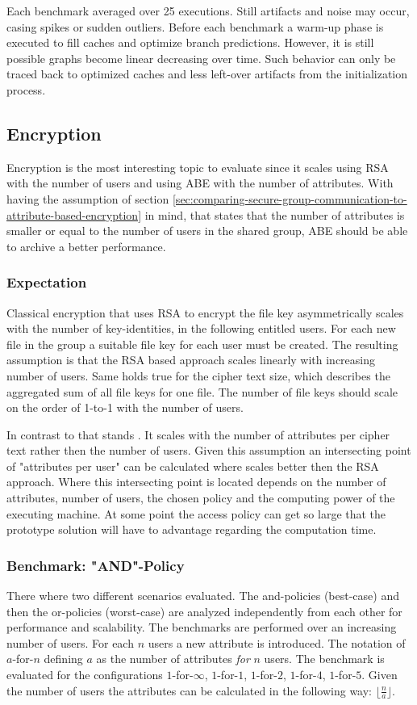 Each benchmark averaged over 25 executions. Still artifacts and noise may occur, casing spikes or sudden outliers. Before each benchmark a warm-up phase is executed to fill caches and optimize branch predictions. However, it is still possible graphs become linear decreasing over time. Such behavior can only be traced back to optimized caches and less left-over artifacts from the initialization process.

\subsection{Encryption}
Encryption is the most interesting topic to evaluate since it scales using RSA with the number of users and using ABE with the number of attributes. With having the assumption of section \ref{sec:comparing-secure-group-communication-to-attribute-based-encryption} in mind, that states that the number of attributes is smaller or equal to the number of users in the shared group, ABE should be able to archive a better performance. 

\subsubsection{Expectation}
Classical encryption that uses RSA to encrypt the file key asymmetrically scales with the number of key-identities, in the following entitled users. For each new file in the group a suitable file key for each user must be created. The resulting assumption is that the RSA based approach scales linearly with increasing number of users. Same holds true for the cipher text size, which describes the aggregated sum of all file keys for one file. The number of file keys should scale on the order of 1-to-1 with the number of users. 

In contrast to that stands \name. It scales with the number of attributes per cipher text rather then the number of users. Given this assumption an intersecting point of "attributes per user" can be calculated where \name scales better then the RSA approach. Where this intersecting point is located depends on the number of attributes, number of users, the chosen policy and the computing power of the executing machine. At some point the access policy can get so large that the prototype solution will have to advantage regarding the computation time. 

\subsubsection{Benchmark: "AND"-Policy}
There where two different scenarios evaluated. The and-policies (best-case) and then the or-policies (worst-case) are analyzed independently from each other for performance and scalability. The benchmarks are performed over an increasing number of users. For each $n$ users a new attribute is introduced. The notation of $a$-for-$n$ defining $a$ as the number of attributes \textit{for} $n$ users. The benchmark is evaluated for the configurations $1$-for-$\infty$, $1$-for-$1$, $1$-for-$2$, $1$-for-$4$, $1$-for-$5$. Given the number of users the attributes can be calculated in the following way: $\lfloor \frac{n}{a} \rfloor$. 

